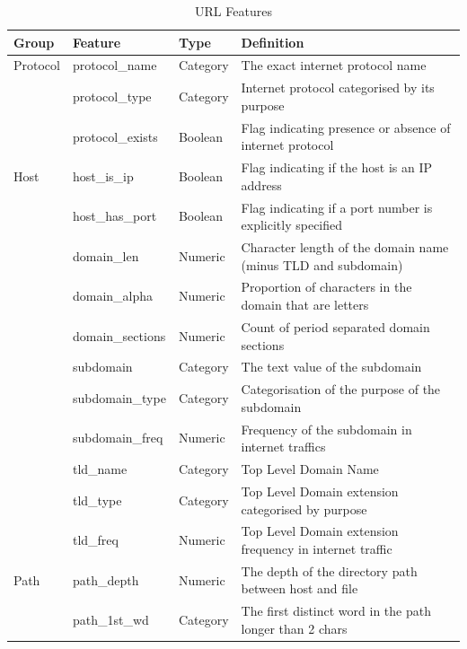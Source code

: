 \documentclass[sigconf]{acmart}
\begin{document}
\begin{table}
\caption{URL Features}
\label{tab:features}
\begin{tabular}{|l|l|l|l|}
\toprule
Group         &Feature              &Type        &Definition  \\
\midrule
Protocol      &protocol\_name         &Category    &The exact internet protocol name    \\
              &protocol\_type         &Category    &Internet protocol categorised by its purpose    \\
              &protocol\_exists       &Boolean     &Flag indicating presence or absence of internet protocol   \\
\midrule
Host          &host\_is\_ip           &Boolean     &Flag indicating if the host is an IP address    \\
              &host\_has\_port        &Boolean     &Flag indicating if a port number is explicitly specified    \\
              &domain\_len            &Numeric     &Character length of the domain name (minus TLD and subdomain)     \\
              &domain\_alpha          &Numeric     &Proportion of characters in the domain that are letters    \\
              &domain\_sections       &Numeric     &Count of period separated domain sections    \\
              &subdomain              &Category    &The text value of the subdomain  \\
              &subdomain\_type        &Category    &Categorisation of the purpose of the subdomain \\
              &subdomain\_freq        &Numeric     &Frequency of the subdomain in internet traffics    \\
              &tld\_name              &Category    &Top Level Domain Name    \\
              &tld\_type              &Category    &Top Level Domain extension categorised by purpose    \\
              &tld\_freq              &Numeric     &Top Level Domain extension frequency in internet traffic   \\
\midrule
Path          &path\_depth            &Numeric     &The depth of the directory path between host and file   \\
              &path\_1st\_wd          &Category    &The first distinct word in the path longer than 2 chars  \\

\end{tabular}
\end{table}
\end{document}
